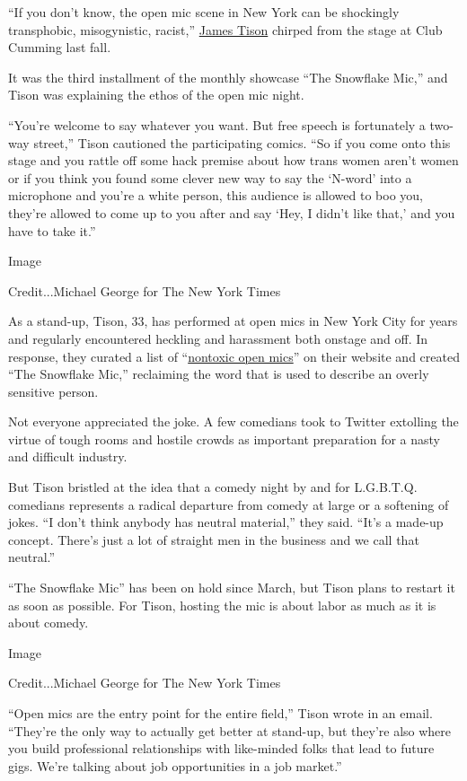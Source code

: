 ``If you don't know, the open mic scene in New York can be shockingly
transphobic, misogynistic, racist,''
\href{https://www.jamestison.com/}{James Tison} chirped from the stage
at Club Cumming last fall.

It was the third installment of the monthly showcase ``The Snowflake
Mic,'' and Tison was explaining the ethos of the open mic night.

``You're welcome to say whatever you want. But free speech is
fortunately a two-way street,'' Tison cautioned the participating
comics. ``So if you come onto this stage and you rattle off some hack
premise about how trans women aren't women or if you think you found
some clever new way to say the `N-word' into a microphone and you're a
white person, this audience is allowed to boo you, they're allowed to
come up to you after and say `Hey, I didn't like that,' and you have to
take it.''

Image

Credit...Michael George for The New York Times

As a stand-up, Tison, 33, has performed at open mics in New York City
for years and regularly encountered heckling and harassment both onstage
and off. In response, they curated a list of
``\href{https://www.jamestison.com/faq}{nontoxic open mics}'' on their
website and created ``The Snowflake Mic,'' reclaiming the word that is
used to describe an overly sensitive person.

Not everyone appreciated the joke. A few comedians took to Twitter
extolling the virtue of tough rooms and hostile crowds as important
preparation for a nasty and difficult industry.

But Tison bristled at the idea that a comedy night by and for L.G.B.T.Q.
comedians represents a radical departure from comedy at large or a
softening of jokes. ``I don't think anybody has neutral material,'' they
said. ``It's a made-up concept. There's just a lot of straight men in
the business and we call that neutral.''

``The Snowflake Mic'' has been on hold since March, but Tison plans to
restart it as soon as possible. For Tison, hosting the mic is about
labor as much as it is about comedy.

Image

Credit...Michael George for The New York Times

``Open mics are the entry point for the entire field,'' Tison wrote in
an email. ``They're the only way to actually get better at stand-up, but
they're also where you build professional relationships with like-minded
folks that lead to future gigs. We're talking about job opportunities in
a job market.''

